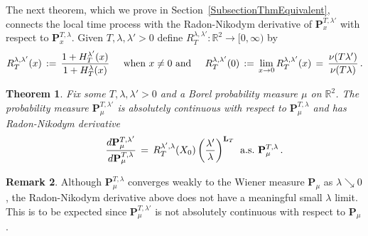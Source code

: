 \documentclass[10pt]{article}
\numberwithin{equation}{section}
\newtheorem{theorem}{Theorem}[section]
\theoremstyle{definition}
\newtheorem{remark}[theorem]{Remark}
\newcommand{\R}{{\mathbb R}}
\begin{document}
The next theorem, which we prove in Section~\ref{SubsectionThmEquivalent}, connects the local time process with the Radon-Nikodym derivative of $\mathbf{P}_{x}^{T,\lambda'}$ with respect to $\mathbf{P}_{x}^{T,\lambda}$.  Given $T,\lambda,\lambda'>0$ define $R^{\lambda,\lambda'}_{T}:\R^2\rightarrow [0,\infty)$ by 
\begin{align}\label{FirstR}
R^{\lambda,\lambda'}_{T}(x)\,:=\,\frac{1+H_{T}^{\lambda'}(x)}{1+H_{T}^{\lambda}(x)  } \hspace{.5cm} \text{when $x\neq 0$ and} \hspace{.5cm}R^{\lambda,\lambda'}_{T}(0)\,:=\,\lim_{x\rightarrow 0} R^{\lambda,\lambda'}_{T}(x) \, =\,\frac{ \nu(T\lambda')  }{ \nu(T\lambda)  }  \,.
\end{align}
\begin{theorem}\label{ThmEquivalent} Fix some $T,\lambda,\lambda' > 0$ and   a Borel probability measure $\mu$ on $\R^2$.  The probability measure $\mathbf{P}_{\mu}^{T,\lambda'}$ is absolutely continuous with respect to $\mathbf{P}_{\mu}^{T,\lambda}$ and has Radon-Nikodym derivative
 \begin{align*}
 \text{}\hspace{.7cm}\frac{d\mathbf{P}_{\mu}^{T,\lambda'}}{d\mathbf{P}_{\mu}^{T,\lambda}}\,=\,R^{\lambda',\lambda}_{T}(X_0) \, \bigg(\frac{ \lambda'}{\lambda}  \bigg)^{\mathbf{L}_{T}} \hspace{.2cm}\text{a.s.}\,\,\mathbf{P}_{\mu}^{T,\lambda}\,.
 \end{align*}
\end{theorem}
\begin{remark} Although $\mathbf{P}_{\mu}^{T,\lambda}$ converges weakly to the Wiener measure $\mathbf{P}_{\mu}$ as $\lambda \searrow 0$, the Radon-Nikodym derivative above does not have a meaningful small $\lambda$ limit. This is to be expected since $\mathbf{P}_{\mu}^{T,\lambda'}$ is not absolutely continuous with respect to $\mathbf{P}_{\mu}$.
\end{remark}
\end{document}
